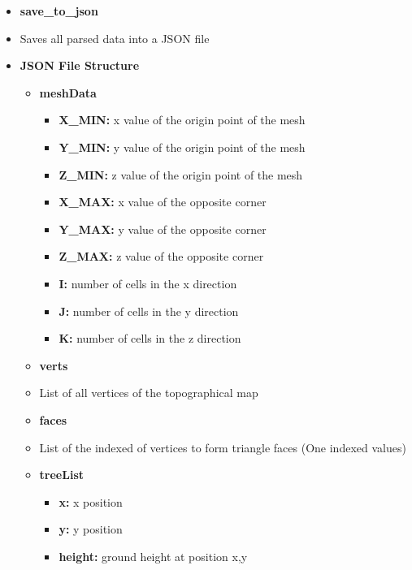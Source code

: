 \begin{itemize}
\begin{itemize}
\begin{itemize}
        \end{itemize} 
    \end{itemize}

    \item \textbf{save\_to\_json}
    \item[] Saves all parsed data into a JSON file
                \item[] \textbf{JSON File Structure}   
                \begin{itemize}
                \item\textbf{meshData}
                    \begin{itemize}
                    \item\textbf{X\_MIN:} x value of the origin point of the mesh 
                    \item\textbf{Y\_MIN:} y value of the origin point of the mesh 
                    \item\textbf{Z\_MIN:} z value of the origin point of the mesh 
                    \item\textbf{X\_MAX:} x value of the opposite corner
                    \item\textbf{Y\_MAX:} y value of the opposite corner
                    \item\textbf{Z\_MAX:} z value of the opposite corner
                    \item\textbf{I:} number of cells in the x direction
                    \item\textbf{J:} number of cells in the y direction
                    \item\textbf{K:} number of cells in the z direction
                    \end{itemize}
                \item\textbf{verts} 
                \item[] List of all vertices of the topographical map
                \item\textbf{faces} 
                \item[] List of the indexed of vertices to form triangle faces (One indexed values)
                \item\textbf{treeList}
                    \begin{itemize}
                    \item\textbf{x:} x position
                    \item\textbf{y:} y position
                    \item\textbf{height:} ground height at position x,y

\end{itemize}
\end{itemize}
\end{itemize}
